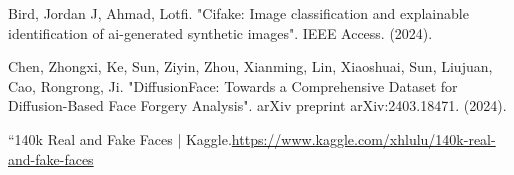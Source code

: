 \documentclass{svproc}
\begin{document}
\begin{thebibliography}{6}
Bird, Jordan J, Ahmad, Lotfi. "Cifake: Image classification and explainable identification of ai-generated synthetic images". IEEE Access. (2024).

Chen, Zhongxi, Ke, Sun, Ziyin, Zhou, Xianming, Lin, Xiaoshuai, Sun, Liujuan, Cao, Rongrong, Ji. "DiffusionFace: Towards a Comprehensive Dataset for Diffusion-Based Face Forgery Analysis". arXiv preprint arXiv:2403.18471. (2024).

“140k Real and Fake Faces | Kaggle.\url{https://www.kaggle.com/xhlulu/140k-real-and-fake-faces}


\end{thebibliography}
\end{document}
